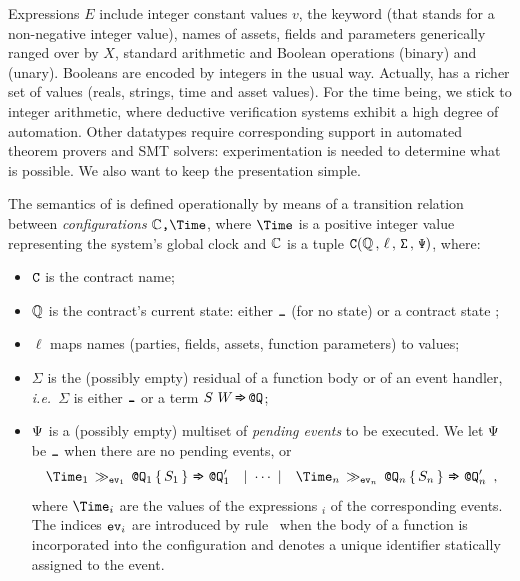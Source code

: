 Expressions $E$ include integer constant values $v$, the keyword
 (that stands for a non-negative integer value), names of
assets, fields and parameters generically ranged over by $X$, standard
arithmetic and Boolean operations  (binary) and
 (unary). Booleans are encoded by integers in the usual
way. Actually, {\Stipula} has a richer set of values (reals, strings, time and
asset values). For the time being, we stick to integer arithmetic,
where deductive verification systems exhibit a high degree of
automation. Other datatypes require corresponding support in automated
theorem provers and SMT solvers: experimentation is needed to
determine what is possible. We also want to keep the presentation simple.

%
The semantics of {\Stipula} is defined operationally by means of a
transition relation between \emph{configurations}
$\contract {\comma} \Time$, where $\Time$ is a positive integer value
representing the system's global clock and $\mathbb{C}$ is a tuple
$\tt C(\mathbb{Q}\,,\,\ell\,,\, \Sigma \,,\,\Psi)$, where:
%
\begin{itemize}
\item $\tt C$ is the {\Stipula} contract name;
\item $\mathbb{Q}$ is the contract's current state: either $\zero$ (for no
  state) or a contract state \state;
\item $\ell$ maps names (parties, fields, assets, function parameters)
  to values;
\item $\Sigma$ is the (possibly empty) residual of a function body or
  of an event handler, \emph{i.e.}~$\Sigma$ is either $\zero$ or a
  term $S\ W \,\mbox{{\tt =\hspace{-2.5pt}>}}\, \texttt{@}\texttt{Q}$;
\item $\Psi$ is a (possibly empty) multiset of \emph{pending
    events} to be executed. We let $\Psi$ be $\zero$ when there
  are no pending events, or
  \begin{equation}
    \label{eq:psi}
    {\Time}_1 \,\event_{\ev_1}\, \Qwithat_1\, \{ \, S_1 \,\}
    \,\tostate\, \Qwithat_1' \quad|~ \cdots ~|\quad {\Time}_n \,\event_{\ev_n}\,
    \Qwithat_n\, \{ \, S_n \,\} \,\tostate\, \Qwithat_n'\enspace,
  \end{equation}
  where $\Time_i$ are the values of the expressions 
  $_i$ of the corresponding events.  The indices ${\tt ev}_i$
  are introduced by rule~ when the body of a
  function is incorporated into the configuration and denotes a unique
  identifier
  statically assigned to the event.
\end{itemize}

